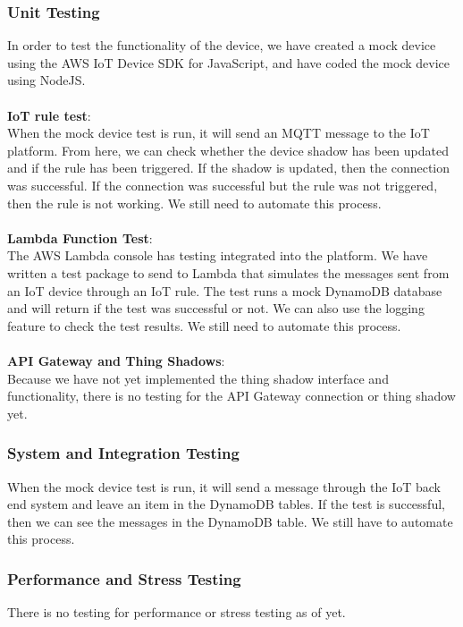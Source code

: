 \documentclass{article}
\begin{document}
		\subsubsection{Unit Testing}
			In order to test the functionality of the device, we have created a mock device using the AWS IoT Device SDK for
			JavaScript, and have coded the mock device using NodeJS.
			\\\\
			\textbf{IoT rule test}:
			\\
			When the mock device test is run, it will send an MQTT message to the IoT platform. From here, we can check whether
			the device shadow has been updated and if the rule has been triggered. If the shadow is updated, then the connection
			was successful. If the connection was successful but the rule was not triggered, then the rule is not working. We
			still need to automate this process.
			\\\\
			\textbf{Lambda Function Test}:
			\\
			The AWS Lambda console has testing integrated into the platform. We have written a test package to send to Lambda
			that simulates the messages sent from an IoT device through an IoT rule. The test runs a mock DynamoDB database
			and will return if the test was successful or not. We can also use the logging feature to check the test results.
			We still need to automate this process.
			\\\\
			\textbf{API Gateway and Thing Shadows}:
			\\
			Because we have not yet implemented the thing shadow interface and functionality, there is no testing for the API
			Gateway connection or thing shadow yet.
			
		\subsubsection{System and Integration Testing}
			When the mock device test is run, it will send a message through the IoT back end system and leave an item in the 
			DynamoDB tables. If the test is successful, then we can see the messages in the DynamoDB table. We still have to 
			automate this process.
			
		\subsubsection{Performance and Stress Testing}
			There is no testing for performance or stress testing as of yet.
	\newpage
		
\end{document}
